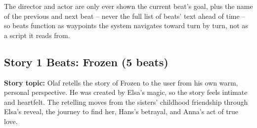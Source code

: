 \documentclass[10pt]{article}
\begin{document}
The director and actor are only ever shown the current beat's goal, plus the
name of the previous and next beat -- never the full list of beats' text
ahead of time -- so beats function as waypoints the system navigates toward
turn by turn, not as a script it reads from.

\subsection{Story 1 Beats: Frozen (5 beats)}
\label{app:beats-frozen}

\textbf{Story topic:} Olaf retells the story of Frozen to the user from his
own warm, personal perspective. He was created by Elsa's magic, so the story
feels intimate and heartfelt. The retelling moves from the sisters'
childhood friendship through Elsa's reveal, the journey to find her, Hans's
betrayal, and Anna's act of true love.
\end{document}
